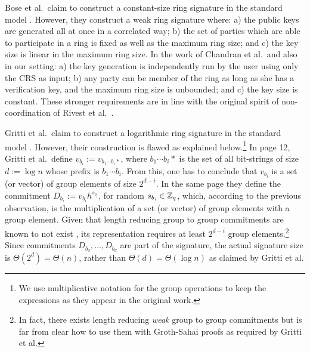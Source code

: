 Bose et al.~claim to construct a constant-size ring signature in the standard model \cite{ACISP:BosDasRan15}. However, they construct a weak ring signature where: a) the public keys are generated all at once in a correlated way; b) the set of parties which are able to participate in a ring is fixed as well as the maximum ring size; and c) the key size is linear in the maximum ring size. In the work of Chandran et al.~and also in our setting: a) the key generation is independently run by the user using only the CRS as input; b) any party can be member of the ring as long as she has a verification key, and the maximum ring size is unbounded; and c) the key size is constant. These stronger requirements are in line with the original spirit of {non-coordination} of  Rivest et al.~\cite{AC:RivShaTau01}.

Gritti et al.~claim to construct a logarithmic ring signature in the standard model \cite{IET:GriSusPla16}. However, their construction is flawed as explained below.\footnote{We use multiplicative notation for the group operations to keep the expressions as they appear in the original work.}
In page 12, Gritti et al.~define $v_{b_i} := v_{b_1\cdots b_i *}$, where $b_1\cdots b_i *$ is the set of all bit-strings of size $d:=\log n$ whose prefix is $b_1\cdots b_i$. From this, one has to conclude that $v_{b_i}$ is a set (or vector) of group elements of size $2^{d-i}$.
In the same page they define the commitment $D_{b_i} := v_{b_i}h^{s_{b_i}}$, for random $s_{b_i}\in\mathbb{Z}_q$, which, according to the previous observation, is the multiplication of a set (or vector) of group elements with a group element. Given that length reducing group to group commitments are known to not exist \cite{EC:AbeHarOhk12}, its representation requires at least $2^{d-i}$ group elements.\footnote{In fact, there exists length reducing \emph{weak} group to group commitments \cite{EC:AKOT15} but is far from clear how to use them with Groth-Sahai proofs as required by Gritti et al.} Since commitments $D_{b_0},\ldots,D_{b_d}$ are part of the signature, the actual signature size is $\Theta(2^d)=\Theta(n)$, rather than  $\Theta(d)=\Theta(\log n)$ as claimed by Gritti et al.

